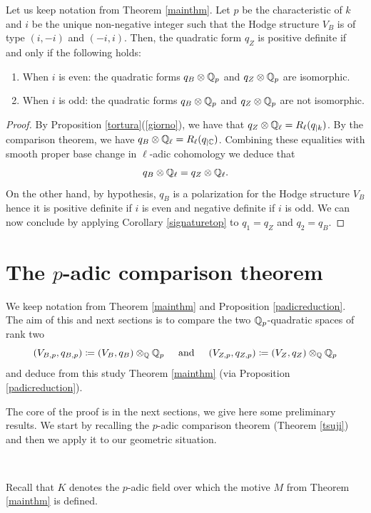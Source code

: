 \documentclass[11pt]{amsart}
\begin{document}
\begin{prop}\label{padicreduction}
Let us keep notation from Theorem \ref{mainthm}. Let $p$ be the characteristic of $k$ and $i$ be the unique non-negative integer such that the Hodge structure $V_B$ is of type $(i,-i)$ and  $(-i,i)$. Then, the quadratic form $q_Z$ is positive definite if and only if the  following   holds:
\begin{enumerate}
\item When $i$ is even: the quadratic forms $q_B\otimes \mathbb{Q}_p$ and $q_Z\otimes \mathbb{Q}_p$ are isomorphic.
\item  When $i$ is odd: the quadratic forms $q_B\otimes \mathbb{Q}_p$ and $q_Z\otimes \mathbb{Q}_p$ are not isomorphic.
\end{enumerate}
\end{prop}
\begin{proof}
By  Proposition \ref{tortura}(\ref{giorno}), we have that $q_Z \otimes \mathbb{Q}_\ell = R_\ell(q_{\vert{k}})$. By the comparison theorem, we have $q_B \otimes \mathbb{Q}_\ell = R_\ell(q_{\vert{\mathbb{C}}})$. Combining these equalities with smooth proper base change in $\ell$-adic cohomology   we deduce that \[q_B \otimes \mathbb{Q}_\ell = q_Z \otimes \mathbb{Q}_\ell.\]
On the other hand, by hypothesis, $q_B$ is a polarization for the Hodge structure $V_B$ hence it is positive definite if $i$ is even and negative definite if $i$ is odd. We can now conclude by applying Corollary \ref{signaturetop} to $q_1=q_Z$ and $q_2=q_B$.
\end{proof}
\section{The $p$-adic comparison theorem}
We keep notation from Theorem \ref{mainthm} and Proposition \ref{padicreduction}.  
The aim of this and next sections is to compare the two $\mathbb{Q}_p$-quadratic spaces of rank two
\[ (V_{B,p},q_{B,p}) \coloneqq (V_B,q_B)\otimes_{\mathbb{Q}} \mathbb{Q}_p \hspace{0.5cm}  \textrm{and}\hspace{0.5cm}  (V_{Z,p},q_{Z,p}) \coloneqq (V_Z,q_Z)\otimes_{\mathbb{Q}} \mathbb{Q}_p\]
and deduce from this study Theorem \ref{mainthm}  (via Proposition \ref{padicreduction}). 

The core of the proof is in the next sections, we give here some preliminary results. We start by recalling the $p$-adic comparison theorem (Theorem \ref{tsuji}) and then we apply it to our geometric situation.  

\

Recall that $K$ denotes the $p$-adic field over which the motive $M$ from Theorem \ref{mainthm} is defined.
\end{document}
